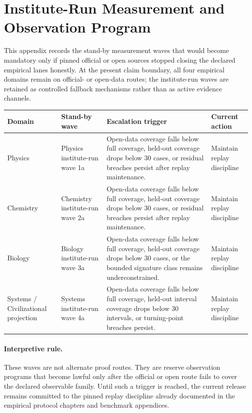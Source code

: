 \section{Institute-Run Measurement and Observation Program}
\label{sec:oc-core-1-3-institute-run-measurement-program}

This appendix records the stand-by measurement waves that would become mandatory
only if pinned official or open sources stopped closing the declared empirical
lanes honestly. At the present claim boundary, all four empirical domains
remain on official- or open-data routes; the institute-run waves are retained
as controlled fallback mechanisms rather than as active evidence channels.

\begingroup
\footnotesize
\RaggedRight
\setlength{\tabcolsep}{4pt}
\setlength{\LTleft}{0pt}
\setlength{\LTright}{0pt}

\begin{table}[htbp]
\centering
\begin{tabular}{@{}L{0.18\textwidth}L{0.24\textwidth}L{0.38\textwidth}L{0.14\textwidth}@{}}
\toprule
Domain & Stand-by wave & Escalation trigger & Current action \\
\midrule
Physics & Physics institute-run wave 1a & Open-data coverage falls below full coverage, held-out coverage drops below 30 cases, or residual breaches persist after replay maintenance. & Maintain replay discipline \\
Chemistry & Chemistry institute-run wave 2a & Open-data coverage falls below full coverage, held-out coverage drops below 30 cases, or residual breaches persist after replay maintenance. & Maintain replay discipline \\
Biology & Biology institute-run wave 3a & Open-data coverage falls below full coverage, held-out coverage drops below 30 cases, or the bounded signature class remains underconstrained. & Maintain replay discipline \\
Systems / Civilizational projection & Systems institute-run wave 4a & Open-data coverage falls below full coverage, held-out interval coverage drops below 30 intervals, or turning-point breaches persist. & Maintain replay discipline \\
\bottomrule
\end{tabular}
\end{table}

\paragraph{Interpretive rule.}
These waves are not alternate proof routes. They are reserve observation
programs that become lawful only after the official or open route fails to
cover the declared observable family. Until such a trigger is reached, the
current release remains committed to the pinned replay discipline already
documented in the empirical protocol chapters and benchmark appendices.

\endgroup
